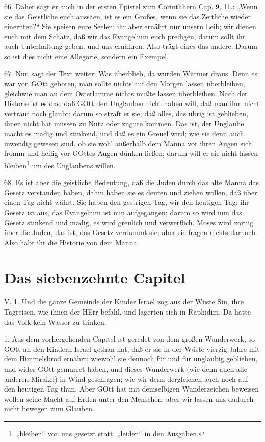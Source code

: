 66. Daher sagt er auch in der ersten Epistel zum Corinthhern Cap. 9, 11.: „Wenn sie das Geistliche euch aussäen, ist es ein Großes, wenn sie das Zeitliche wieder einernten?“ Sie speisen eure Seelen; ihr aber ernährt nur unsern Leib; wir dienen euch mit dem Schatz, daß wir das Evangelium euch predigen, darum sollt ihr auch Unterhaltung geben, und uns ernähren. Also trägt eines das andere. Darum so ist dies nicht eine Allegorie, sondern ein Exempel.

67. Nun sagt der Text weiter: Was überblieb, da wurden Würmer draus. Denn es war von GOtt geboten, man sollte nichts auf den Morgen lassen überbleiben, gleichwie man an dem Osterlamme nichts mußte lassen überbleiben. Nach der Historie ist es das, daß GOtt den Unglauben nicht haben will, daß man ihm nicht vertraut noch glaubt; darum so straft er sie, daß alles, das übrig ist geblieben, ihnen nicht hat müssen zu Nutz oder zugute kommen. Das ist, der Unglaube macht es madig und stinkend, und daß es ein Greuel wird; wie sie denn auch inwendig gewesen sind, ob sie wohl außerhalb dem Manna vor ihren Augen sich fromm und heilig vor GOttes Augen dünken ließen; darum will er sie nicht lassen bleiben\footnote{„bleiben“ von uns gesetzt statt: „leiden“ in den Ausgaben.} um des Unglaubens willen.

68. Es ist aber die geistliche Bedeutung, daß die Juden durch das alte Manna das Gesetz verstanden haben, dahin haben sie es deuten und ziehen wollen, daß über einen Tag nicht währt. Sie haben den gestrigen Tag, wir den heutigen Tag; ihr Gesetz ist aus, das Evangelium ist nun aufgegangen; darum so wird nun das Gesetz stinkend und madig, es wird greulich und verwerflich. Moses wird zornig über die Juden, das ist, das Gesetz verdammt sie; aber sie fragen nichts darnach. Also habt ihr die Historie von dem Manna.

\section{Das siebenzehnte Capitel}

\begin{schriftzitat}
V. 1. Und die ganze Gemeinde der Kinder Israel zog aus der Wüste Sin, ihre Tagreisen, wie ihnen der HErr befahl, und lagerten sich in Raphidim. Da hatte das Volk kein Wasser zu trinken.
\end{schriftzitat}

1. Aus dem vorhergehenden Capitel ist geredet von dem großen Wunderwerk, so GOtt an den Kindern Israel gethan hat, daß er sie in der Wüste vierzig Jahre mit dem Himmelsbrod ernährt; wiewohl sie dennoch für und für ungläubig geblieben, und wider GOtt gemurret haben, und dieses Wunderwerk (wie denn auch alle anderen Mirakel) in Wind geschlagen; wie wir denn dergleichen auch noch auf den heutigen Tag thun. Aber GOtt hat mit demselbigen Wunderzeichen beweisen wollen seine Macht auf Erden unter den Menschen; aber wir lassen uns dadurch nicht bewegen zum Glauben.

